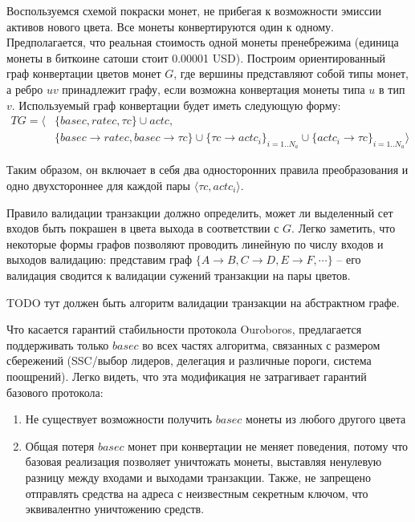 \documentclass[specification,annotation]{itmo-student-thesis}
\begin{document}
Воспользуемся схемой покраски монет, не прибегая к возможности эмиссии
активов нового цвета. Все монеты конвертируются один к
одному. Предполагается, что реальная стоимость одной монеты
пренебрежима (единица монеты в биткоине сатоши стоит 0.00001
USD). Построим ориентированный граф конвертации цветов монет $G$, где
вершины представляют собой типы монет, а ребро $uv$ принадлежит графу,
если возможна конвертация монеты типа $u$ в тип $v$. Используемый граф
конвертации будет иметь следующую форму:
\begin{align*}
  TG = \langle &\{basec, ratec, \tau c\} \cup actc,\\
  &\{basec \rightarrow ratec
  , basec \rightarrow \tau c\} \cup
  \{\tau c \rightarrow actc_i\}_{i=1..N_a} \cup
  \{actc_i \rightarrow \tau c\}_{i=1..N_a}\rangle
\end{align*}

Таким образом, он включает в себя два односторонних правила
преобразования и одно двухстороннее для каждой пары $\langle \tau c,
actc_i\rangle$.

Правило валидации транзакции должно определить, может ли выделенный
сет входов быть покрашен в цвета выхода в соответствии с $G$. Легко
заметить, что некоторые формы графов позволяют проводить линейную по
числу входов и выходов валидацию: представим граф $\{A \rightarrow B,
C \rightarrow D, E \rightarrow F, \cdots\}$ -- его валидация сводится
к валидации сужений транзакции на пары цветов.

TODO тут должен быть алгоритм валидации транзакции на абстрактном графе.

Что касается гарантий стабильности протокола Ouroboros, предлагается
поддерживать только $basec$ во всех частях алгоритма, связанных с
размером сбережений (SSC/выбор лидеров, делегация и различные пороги,
система поощрений). Легко видеть, что эта модификация не затрагивает
гарантий базового протокола:

\begin{enumerate}
\item Не существует возможности получить $basec$ монеты из любого
  другого цвета
\item Общая потеря $basec$ монет при конвертации не меняет поведения,
  потому что базовая реализация позволяет уничтожать монеты, выставляя
  ненулевую разницу между входами и выходами транзакции. Также, не
  запрещено отправлять средства на адреса с неизвестным секретным
  ключом, что эквивалентно уничтожению средств.
\end{enumerate}
\end{document}
